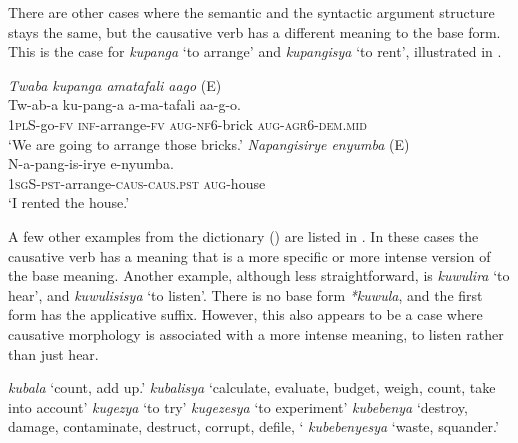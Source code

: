 \documentclass[output=paper,colorlinks,citecolor=brown,draftmode]{langscibook}
\begin{document}

There are other cases where the semantic and the syntactic argument structure stays the same, but the causative verb has a different meaning to the base form. This is the case for \emph{kupanga} `to arrange' and \emph{kupangisya} `to rent', illustrated in . 

\ea
\begin{xlist}   \label{ex:Saebo:rent}
 \ex \emph{Twaba kupanga amatafali aago} (E)\\
  \gll  Tw-ab-a ku-pang-a a-ma-tafali aa-g-o. \\ 
\textsc{1pl}S-go-\textsc{fv} \textsc{inf}-arrange-\textsc{fv} \textsc{aug-nf6}-brick \textsc{aug-agr6-dem.mid} \\
    \glt  `We are going to arrange those bricks.' 
 \ex \emph{Napangisirye enyumba} (E) \\
  \gll N-a-pang-is-irye e-nyumba.  \\ 
\textsc{1sg}S-\textsc{pst}-arrange-\textsc{caus-caus.pst} \textsc{aug}-house\\
    \glt  `I rented the house.' 
      \end{xlist}     
      \z
      
A few other examples from the dictionary (\cite{Nzogi2012dictionary}) are listed in . In these cases the causative verb has a meaning that is a more specific or more intense version of the base meaning. Another example, although less straightforward, is \emph{kuwulira} `to hear', and \emph{kuwulisisya} `to listen'. There is no base form \emph{*kuwula}, and the first form has the applicative suffix. However, this also appears to be a case where causative morphology is associated with a more intense meaning, to listen rather than just hear. 

\ea
\begin{xlist}   \label{ex:Saebo:dictionary}
        \ex \emph{kubala} ‘count, add up.'
         \ex \emph{kubalisya} ‘calculate, evaluate, budget, weigh, count, take into account'
         \ex \emph{kugezya} ‘to try'
         \ex \emph{kugezesya} ‘to experiment'
        \ex \emph{kubebenya} ‘destroy, damage, contaminate, destruct, corrupt, defile, `
         \ex \emph{kubebenyesya} ‘waste, squander.'
\end{xlist}     
\z
\end{document}
